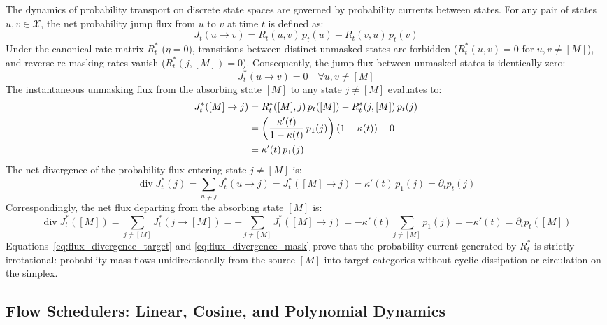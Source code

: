 The dynamics of probability transport on discrete state spaces are governed by probability currents between states. For any pair of states $u, v \in \mathcal{X}$, the net probability jump flux from $u$ to $v$ at time $t$ is defined as:
\begin{equation}
J_t(u \to v) = R_t(u, v) \, p_t(u) - R_t(v, u) \, p_t(v)
\label{eq:jump_flux_def}
\end{equation}
Under the canonical rate matrix $R_t^*$ ($\eta = 0$), transitions between distinct unmasked states are forbidden ($R_t^*(u, v) = 0$ for $u, v \ne [M]$), and reverse re-masking rates vanish ($R_t^*(j, [M]) = 0$). Consequently, the jump flux between unmasked states is identically zero:
\begin{equation}
J_t^*(u \to v) = 0 \quad \forall u, v \ne [M]
\end{equation}
The instantaneous unmasking flux from the absorbing state $[M]$ to any state $j \ne [M]$ evaluates to:
\begin{align}
J_t^*([M] \to j) &= R_t^*([M], j) \, p_t([M]) - R_t^*(j, [M]) \, p_t(j) \notag \\
&= \left( \frac{\kappa'(t)}{1 - \kappa(t)} \, p_1(j) \right) (1 - \kappa(t)) - 0 \notag \\
&= \kappa'(t) \, p_1(j)
\label{eq:flux_unmask_exact}
\end{align}
The net divergence of the probability flux entering state $j \ne [M]$ is:
\begin{equation}
\operatorname{div} J_t^*(j) = \sum_{u \ne j} J_t^*(u \to j) = J_t^*([M] \to j) = \kappa'(t) \, p_1(j) = \partial_t p_t(j)
\label{eq:flux_divergence_target}
\end{equation}
Correspondingly, the net flux departing from the absorbing state $[M]$ is:
\begin{equation}
\operatorname{div} J_t^*([M]) = \sum_{j \ne [M]} J_t^*(j \to [M]) = - \sum_{j \ne [M]} J_t^*([M] \to j) = -\kappa'(t) \sum_{j \ne [M]} p_1(j) = -\kappa'(t) = \partial_t p_t([M])
\label{eq:flux_divergence_mask}
\end{equation}
Equations~\ref{eq:flux_divergence_target} and \ref{eq:flux_divergence_mask} prove that the probability current generated by $R_t^*$ is strictly irrotational: probability mass flows unidirectionally from the source $[M]$ into target categories without cyclic dissipation or circulation on the simplex.

\subsection{Flow Schedulers: Linear, Cosine, and Polynomial Dynamics}

